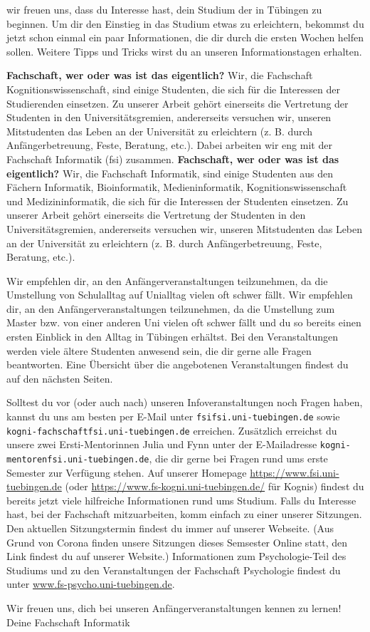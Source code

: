 wir freuen uns, dass du Interesse hast, dein Studium der \studiengang in Tübingen zu beginnen.
Um dir den Einstieg in das Studium etwas zu erleichtern, bekommst du jetzt schon einmal
ein paar Informationen, die dir durch die ersten Wochen helfen sollen.
Weitere Tipps und Tricks wirst du an unseren Informationstagen %
erhalten.


\ifkogwiss
\textbf{\glqq Fachschaft\grqq, wer oder was ist das eigentlich?} Wir, die Fachschaft Kognitionswissenschaft, sind einige Studenten, die sich für die Interessen der Studierenden einsetzen. Zu unserer Arbeit
gehört einerseits die Vertretung der Studenten in den Universitätsgremien, andererseits versuchen wir, unseren
Mitstudenten das Leben an der Universität zu erleichtern (z. B. durch Anfängerbetreuung, Feste,
Beratung, etc.). Dabei arbeiten wir eng mit der Fachschaft Informatik (fsi) zusammen.
\else
\textbf{\glqq Fachschaft\grqq, wer oder was ist das eigentlich?} Wir, die Fachschaft Informatik, sind einige Studenten aus den Fächern
Informatik, Bioinformatik, Medieninformatik, Kognitionswissenschaft und Medizin\-informatik, die sich für die Interessen der Studenten einsetzen. Zu unserer Arbeit
gehört einerseits die Vertretung der Studenten in den Universitätsgremien, andererseits versuchen wir, unseren
Mitstudenten das Leben an der Universität zu erleichtern (z. B. durch Anfängerbetreuung, Feste,
Beratung, etc.).
\fi

\ifbachelor 
Wir empfehlen dir, an den Anfängerveranstaltungen teilzunehmen, da die Umstellung von Schulalltag
auf Unialltag vielen oft schwer fällt. 
\fi
\ifmaster
Wir empfehlen dir, an den Anfängerveranstaltungen teilzunehmen, da die Umstellung zum Master bzw. von einer anderen Uni vielen oft schwer fällt und du so bereits einen ersten Einblick in den Alltag in Tübingen erhältst.
\fi 
Bei den Veranstaltungen werden viele ältere Studenten
anwesend sein, die dir gerne alle Fragen beantworten. Eine Übersicht über die angebotenen
Veranstaltungen findest du auf den nächsten Seiten.

Solltest du vor (oder auch nach) unseren Infoveranstaltungen noch Fragen haben, kannst du uns
am besten per E-Mail unter \texttt{fsi\At fsi.uni-tuebingen.de} 
\ifkogwiss
sowie \texttt{kogni-fachschaft\At fsi.uni-tuebingen.de}
\fi
erreichen.
\ifkogwiss
Zusätzlich erreichst du unsere zwei Ersti-Mentorinnen Julia und Fynn unter der E-Mailadresse \texttt{kogni-mentoren\At fsi.uni-tuebingen.de}, die dir gerne bei Fragen rund ums erste Semester zur Verfügung stehen.
\fi
Auf unserer Homepage
\url{https://www.fsi.uni-tuebingen.de} (oder \url{https://www.fs-kogni.uni-tuebingen.de/} für Kognis) findest du bereits jetzt viele hilfreiche Informationen rund
ums Studium. Falls du Interesse hast, bei der Fachschaft mitzuarbeiten, komm einfach zu einer unserer Sitzungen. Den aktuellen Sitzungstermin findest du immer auf unserer Webseite. (Aus Grund von Corona finden unsere Sitzungen dieses Semsester Online statt, den Link findest du auf unserer Website.)
\ifkogwiss  Informationen zum Psychologie-Teil des Studiums und zu den Veranstaltungen der
Fachschaft Psychologie findest du unter \url{www.fs-psycho.uni-tuebingen.de}.\fi

Wir freuen uns, dich bei unseren Anfängerveranstaltungen kennen zu lernen!\\
Deine Fachschaft Informatik
\vfill
